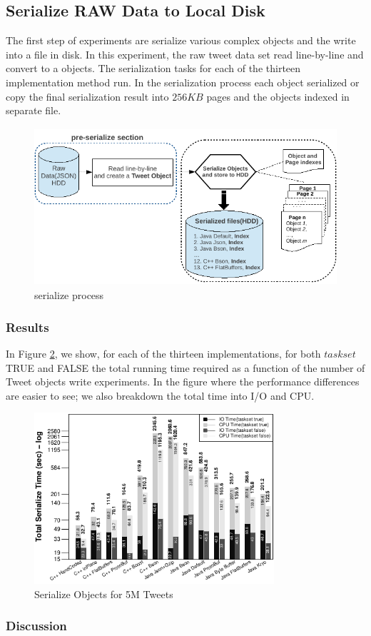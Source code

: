 \subsection{Serialize RAW Data to Local Disk}

The first step of experiments are serialize various complex objects and the write into a file in disk. In this experiment, the raw tweet data set read line-by-line and convert to a objects. The serialization tasks for each of the thirteen implementation method run. In the serialization process each object serialized or copy the final serialization result into $256KB$ pages and the objects indexed in separate file. 

\begin{figure}
	\centering
	\includegraphics[width=\columnwidth,height=2.3in,keepaspectratio]{img/serialize_process.pdf}
	\caption{serialize process}
	\label{fig:serialize_process}
\end{figure}

\subsubsection{Results}

In Figure \ref{fig:exp_serialization_bar}, we show, for each of the thirteen implementations, for both $taskset$ TRUE and FALSE the total running time required as a function of the number of Tweet objects write experiments. In the figure where the
performance differences are easier to see; we also breakdown
the total time into I/O and CPU.
\begin{figure}
	\centering
	\includegraphics[width=\columnwidth,height=2.5in,keepaspectratio]{../../RScripts/Experiment_SerializeObjects_Bar.pdf}
	\caption{Serialize Objects for 5M Tweets}
	\label{fig:exp_serialization_bar}
\end{figure}

\subsubsection{Discussion}
